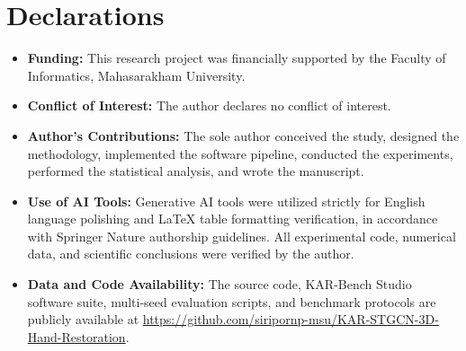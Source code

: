 \documentclass[10pt,twocolumn]{article}
\begin{document}
\section*{Declarations}
\begin{itemize}
    \item \textbf{Funding:} This research project was financially supported by the Faculty of Informatics, Mahasarakham University.
    \item \textbf{Conflict of Interest:} The author declares no conflict of interest.
    \item \textbf{Author's Contributions:} The sole author conceived the study, designed the methodology, implemented the software pipeline, conducted the experiments, performed the statistical analysis, and wrote the manuscript.
    \item \textbf{Use of AI Tools:} Generative AI tools were utilized strictly for English language polishing and LaTeX table formatting verification, in accordance with Springer Nature authorship guidelines. All experimental code, numerical data, and scientific conclusions were verified by the author.
    \item \textbf{Data and Code Availability:} The source code, KAR-Bench Studio software suite, multi-seed evaluation scripts, and benchmark protocols are publicly available at \url{https://github.com/siripornp-msu/KAR-STGCN-3D-Hand-Restoration}.
\end{itemize}
\end{document}
